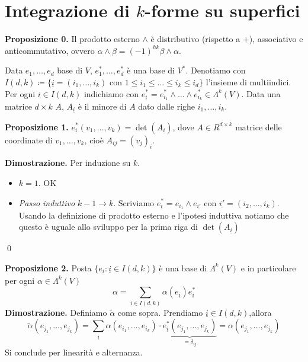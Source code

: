 \section{Integrazione di $k$-forme su superfici}

\textbf{Proposizione 0.} Il prodotto esterno $\wedge$ è distributivo (rispetto a +), associativo e anticommutativo, ovvero $\alpha \wedge \beta = (-1)^{hk} \beta \wedge \alpha$.

Data $e_1,\ldots,e_d$ base di $V$, $e_1^*,\ldots,e_d^*$ è una base di $V^*$.
Denotiamo con $I(d,k) \coloneqq \{ \underline{i} = (i_1,\ldots,i_k) \text{ con } 1 \leq i_1 \leq \ldots \leq i_k \leq i_d \}$ l'insieme di multiindici.
Per ogni $i \in I(d,k)$ indichiamo con $e_{\underline{i}}^* = e_{i_1}^* \wedge \ldots \wedge e_{i_k}^* \in \Lambda^k(V)$. Data una matrice $d \times k$ $A$, $A_{\underline{i}}$ è il minore di $A$ dato dalle righe $i_1,\ldots,i_k$.

\textbf{Proposizione 1.} $e_{\underline{i}}^* (v_1,\ldots,v_k) = \det(A_{\underline{i}})$, dove $A \in R^{d\times k}$ matrice delle coordinate di $v_1,\ldots,v_k$, cioè $A_{ij} = (v_j)_i$.

\textbf{Dimostrazione.} Per induzione su $k$.
\begin{itemize}

	\item $k=1$. OK

	\item \textit{Passo induttivo} $k-1 \to k$. Scriviamo $e_{\underline{i}}^* = e_{i_1} \wedge e_{\underline{i'}}$ con $\underline{i'} = (i_2,\ldots,i_k)$.
	Usando la definizione di prodotto esterno e l'ipotesi induttiva notiamo che questo è uguale allo sviluppo per la prima riga di $\det(A_{\underline{i}})$

\end{itemize}
\qed

\textbf{Proposizione 2.} Posta $\{e_{\underline{i}} \colon \underline{i} \in I(d,k) \}$ è una base di $\Lambda^k(V)$ e in particolare per ogni $\alpha \in \Lambda^k(V)$
%
$$
	\alpha = \sum_{\underline{i} \in I(d,k)} \alpha(e_{\underline{i}}) e_{\underline{i}}^* 
$$
%
\textbf{Dimostrazione.} Definiamo $\tilde{\alpha}$ come sopra. Prendiamo $\underline{i} \in I(d,k)$,allora
%
$$
\tilde{\alpha}(e_{j_1},\ldots,e_{j_k}) = \sum_{\underline{i}} \alpha \left( e_{i_1},\ldots,e_{i_k} \right) \cdot \underbrace{e_{\underline{i}}^* (e_{j_1},\ldots,e_{j_k})}_{= \delta_{ij}} = \alpha (e_{j_1},\ldots,e_{j_k})
$$
%
Si conclude per linearità e alternanza.


